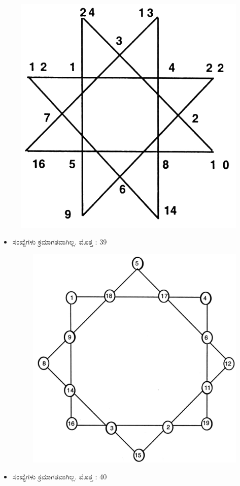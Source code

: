 \begin{figure}[H]
\includegraphics{src/figures/chap8/fig8-6.jpg}
\end{figure}
\begin{itemize}
	\item ಸಂಖ್ಯೆಗಳು ಕ್ರಮಾಗತವಾಗಿಲ್ಲ. ಮೊತ್ತ : 39
	\begin{figure}[H]
	\includegraphics{src/figures/chap8/fig8-7.jpg}
	\end{figure}
	\item ಸಂಖ್ಯೆಗಳು ಕ್ರಮಾಗತವಾಗಿಲ್ಲ. ಮೊತ್ತ : 40
\end{itemize}

